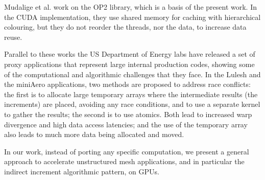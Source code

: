 Mudalige et al. \cite{op2} work on the OP2 library, which is a basis of the
present work. In the CUDA implementation, they use shared memory for caching
with hierarchical colouring, but they do not reorder the threads, nor the data,
to increase data reuse.

Parallel to these works the US Department of Energy labs have released a set of
proxy applications that represent large internal production codes, showing some
of the computational and algorithmic challenges that they face. In the Lulesh
\cite{LULESH2:changes} and the miniAero \cite{miniaero} applications, two
methods are proposed to address race conflicts: the first is to allocate large
temporary arrays where the intermediate results (the increments) are placed,
avoiding any race conditions, and to use a separate kernel to gather the
results; the second is to use atomics. Both lead to increased warp divergence
and high data access latencies; and the use of the temporary array also leads to much
more data being allocated and moved.

In our work, instead of porting any specific computation, we present a general
approach to accelerate unstructured mesh applications, and in particular the
indirect increment algorithmic pattern, on GPUs.
